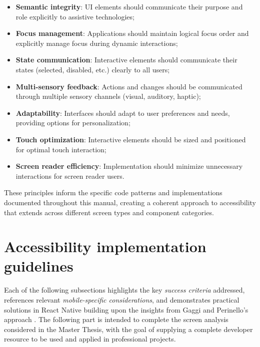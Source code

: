 \begin{itemize}
    \item \textbf{Semantic integrity}: UI elements should communicate their purpose and role explicitly to assistive technologies;
    
    \item \textbf{Focus management}: Applications should maintain logical focus order and explicitly manage focus during dynamic interactions;
    
    \item \textbf{State communication}: Interactive elements should communicate their states (selected, disabled, etc.) clearly to all users;
    
    \item \textbf{Multi-sensory feedback}: Actions and changes should be communicated through multiple sensory channels (visual, auditory, haptic);
    
    \item \textbf{Adaptability}: Interfaces should adapt to user preferences and needs, providing options for personalization;
    
    \item \textbf{Touch optimization}: Interactive elements should be sized and positioned for optimal touch interaction;
    
    \item \textbf{Screen reader efficiency}: Implementation should minimize unnecessary interactions for screen reader users.
\end{itemize}

These principles inform the specific code patterns and implementations documented throughout this manual, creating a coherent approach to accessibility that extends across different screen types and component categories.

\section{Accessibility implementation guidelines}
\label{sec:implementation-guidelines}

Each of the following subsections highlights the key \textit{success criteria} addressed, references relevant \textit{mobile-specific considerations}, and demonstrates practical solutions in React Native building upon the insights from Gaggi and Perinello's approach \cite{budai2024mobile}. The following part is intended to complete the screen analysis considered in the Master Thesis, with the goal of supplying a complete developer resource to be used and applied in professional projects.

